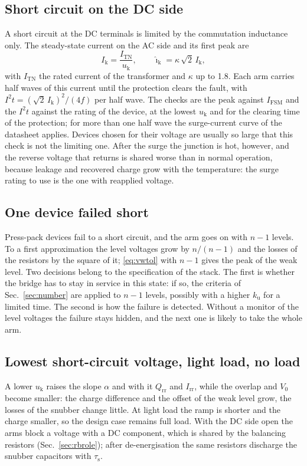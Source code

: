 \documentclass[10pt,a4paper]{scrartcl}
\newcommand{\Qrr}{Q_\mathrm{rr}}
\newcommand{\Irr}{I_\mathrm{rr}}
\newcommand{\Vo}{V_0}
\newcommand{\taus}{\tau_\mathrm{s}}
\newcommand{\uk}{u_\mathrm{k}}
\newcommand{\ku}{k_\mathrm{u}}
\begin{document}
\subsection{Short circuit on the DC side}
A short circuit at the DC terminals is limited by the commutation inductance only. The steady-state current on the AC side and its first peak are
\begin{equation}
I_\mathrm{k} = \frac{I_\mathrm{TN}}{\uk}, \qquad \hat\imath_\mathrm{k} = \kappa\,\sqrt2\,I_\mathrm{k},
\label{eq:ik}
\end{equation}
with $I_\mathrm{TN}$ the rated current of the transformer and $\kappa$ up to 1.8. Each arm carries half waves of this current until the protection clears the fault, with $I^2t = (\sqrt2\,I_\mathrm{k})^2/(4f)$ per half wave. The checks are the peak against $I_\mathrm{FSM}$ and the $I^2t$ against the rating of the device, at the lowest $\uk$ and for the clearing time of the protection; for more than one half wave the surge-current curve of the datasheet applies. Devices chosen for their voltage are usually so large that this check is not the limiting one. After the surge the junction is hot, however, and the reverse voltage that returns is shared worse than in normal operation, because leakage and recovered charge grow with the temperature: the surge rating to use is the one with reapplied voltage.

\subsection{One device failed short}
Press-pack devices fail to a short circuit, and the arm goes on with $n - 1$ levels. To a first approximation the level voltages grow by $n/(n-1)$ and the losses of the resistors by the square of it; \eqref{eq:vwtol} with $n - 1$ gives the peak of the weak level. Two decisions belong to the specification of the stack. The first is whether the bridge has to stay in service in this state: if so, the criteria of Sec.~\ref{sec:number} are applied to $n - 1$ levels, possibly with a higher $\ku$ for a limited time. The second is how the failure is detected. Without a monitor of the level voltages the failure stays hidden, and the next one is likely to take the whole arm.

\subsection{Lowest short-circuit voltage, light load, no load}
A lower $\uk$ raises the slope $\alpha$ and with it $\Qrr$ and $\Irr$, while the overlap and $\Vo$ become smaller: the charge difference and the offset of the weak level grow, the losses of the snubber change little. At light load the ramp is shorter and the charge smaller, so the design case remains full load. With the DC side open the arms block a voltage with a DC component, which is shared by the balancing resistors (Sec.~\ref{sec:rbrole}); after de-energisation the same resistors discharge the snubber capacitors with $\taus$.
\end{document}
